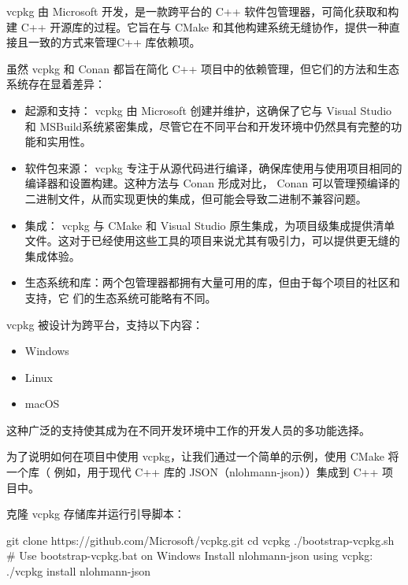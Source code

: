 
vcpkg 由 Microsoft 开发，是一款跨平台的 C++ 软件包管理器，可简化获取和构建 C++ 开源库的过程。它旨在与 CMake 和其他构建系统无缝协作，提供一种直接且一致的方式来管理C++ 库依赖项。


虽然 vcpkg 和 Conan 都旨在简化 C++ 项目中的依赖管理，但它们的方法和生态系统存在显着差异：

\begin{itemize}
\item
起源和支持： vcpkg 由 Microsoft 创建并维护，这确保了它与 Visual Studio 和 MSBuild系统紧密集成，尽管它在不同平台和开发环境中仍然具有完整的功能和实用性。

\item
软件包来源： vcpkg 专注于从源代码进行编译，确保库使用与使用项目相同的编译器和设置构建。这种方法与 Conan 形成对比， Conan 可以管理预编译的二进制文件，从而实现更快的集成，但可能会导致二进制不兼容问题。

\item
集成： vcpkg 与 CMake 和 Visual Studio 原生集成，为项目级集成提供清单文件。这对于已经使用这些工具的项目来说尤其有吸引力，可以提供更无缝的集成体验。

\item
生态系统和库：两个包管理器都拥有大量可用的库，但由于每个项目的社区和支持，它
们的生态系统可能略有不同。
\end{itemize}


vcpkg 被设计为跨平台，支持以下内容：

\begin{itemize}
\item
Windows

\item
Linux

\item
macOS
\end{itemize}

这种广泛的支持使其成为在不同开发环境中工作的开发人员的多功能选择。


为了说明如何在项目中使用 vcpkg，让我们通过一个简单的示例，使用 CMake 将一个库（ 例如，用于现代 C++ 库的 JSON（nlohmann-json））集成到 C++ 项目中。

克隆 vcpkg 存储库并运行引导脚本：

\begin{shell}
git clone https://github.com/Microsoft/vcpkg.git
cd vcpkg
./bootstrap-vcpkg.sh # Use bootstrap-vcpkg.bat on Windows
Install nlohmann-json using vcpkg:
./vcpkg install nlohmann-json
\end{shell}

